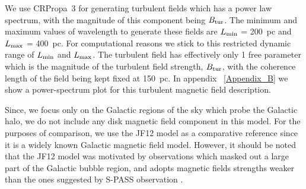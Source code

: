 \documentclass[12pt, a4 paper]{mnras}
\begin{document}
We use CRPropa~3 \cite{CRPropa3_2016} for generating turbulent fields which has a power law spectrum, with the magnitude of this component being $B_{\rm{tur}}$. 
The minimum and maximum values of wavelength to generate these fields are  $L_{\rm min}$ = 200~pc and $L_{\rm max}$ = 400~pc. For computational reasons we stick to this restricted dynamic range of $L_{\rm min}$ and $L_{\rm max}$. The turbulent field has effectively only 1 free parameter which is the magnitude of the turbulent field strength, $ B_{\rm tur}$, with the coherence length of the field being kept fixed at 150~pc.  In appendix ~\ref{Appendix_B} we show a power-spectrum plot for this turbulent magnetic field description.

Since, we focus only on the Galactic regions of the sky which probe the Galactic halo, we do not include any disk magnetic field component in this model. For the purposes of comparison, we use the JF12 model as a comparative reference since it is a widely known Galactic magnetic field model.
However, it should be noted that the JF12 model was motivated by observations which masked out a large part of the Galactic bubble region, and adopts magnetic fields strengths weaker than the ones suggested by S-PASS observation \cite{Carretti_2013}.
\end{document}
